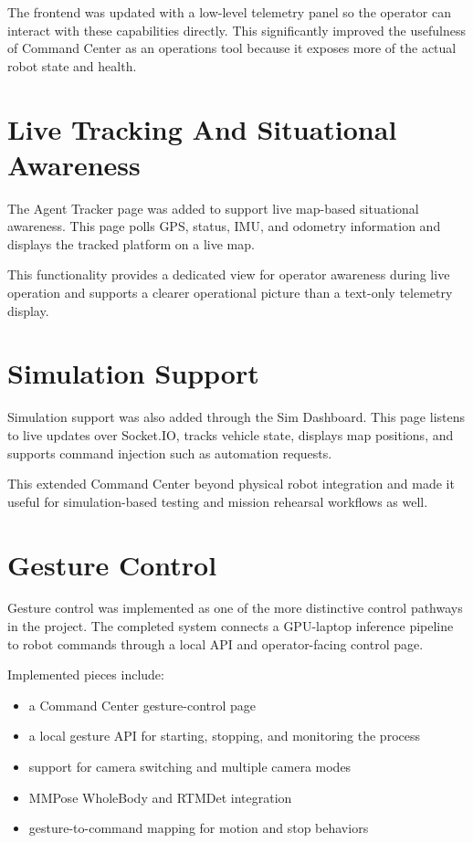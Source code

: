 \documentclass[11pt]{article}
\begin{document}
The frontend was updated with a low-level telemetry panel so the operator can interact with these capabilities directly. This significantly improved the usefulness of Command Center as an operations tool because it exposes more of the actual robot state and health.

\section{Live Tracking And Situational Awareness}

The Agent Tracker page was added to support live map-based situational awareness. This page polls GPS, status, IMU, and odometry information and displays the tracked platform on a live map.

This functionality provides a dedicated view for operator awareness during live operation and supports a clearer operational picture than a text-only telemetry display.

\section{Simulation Support}

Simulation support was also added through the Sim Dashboard. This page listens to live updates over Socket.IO, tracks vehicle state, displays map positions, and supports command injection such as automation requests.

This extended Command Center beyond physical robot integration and made it useful for simulation-based testing and mission rehearsal workflows as well.

\section{Gesture Control}

Gesture control was implemented as one of the more distinctive control pathways in the project. The completed system connects a GPU-laptop inference pipeline to robot commands through a local API and operator-facing control page.

Implemented pieces include:

\begin{itemize}
  \item a Command Center gesture-control page
  \item a local gesture API for starting, stopping, and monitoring the process
  \item support for camera switching and multiple camera modes
  \item MMPose WholeBody and RTMDet integration
  \item gesture-to-command mapping for motion and stop behaviors
\end{itemize}
\end{document}
